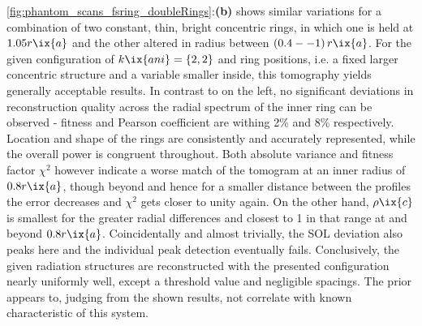                 \autoref{fig:phantom_scans_fsring_doubleRings}:\textbf{(b)} shows similar variations for a combination of two constant, thin, bright concentric rings, in which one is held at $1.05r\ix{a}$ and the other altered in radius between $\left(0.4--1\right)r\ix{a}$. For the given configuration of $k\ix{ani}=\left\{2, 2\right\}$ and ring positions, i.e. a fixed larger concentric structure and a variable smaller inside, this tomography yields generally acceptable results. In contrast to on the left, no significant deviations in reconstruction quality across the radial spectrum of the inner ring can be observed - fitness and Pearson coefficient are withing 2\% and 8\% respectively. Location and shape of the rings are consistently and accurately represented, while the overall power is congruent throughout. Both absolute variance and fitness factor $\chi^{2}$ however indicate a worse match of the tomogram at an inner radius of $0.8r\ix{a}$, though beyond and hence for a smaller distance between the profiles the error decreases and $\chi^{2}$ gets closer to unity again. On the other hand, $\rho\ix{c}$ is smallest for the greater radial differences and closest to \SI{1}{\arbitraryunit} in that range at and beyond $0.8r\ix{a}$. Coincidentally and almost trivially, the SOL deviation also peaks here and the individual peak detection eventually fails. Conclusively, the given radiation structures are reconstructed with the presented configuration nearly uniformly well, except a threshold value and negligible spacings. The prior appears to, judging from the shown results, not correlate with known characteristic of this system.%
%
